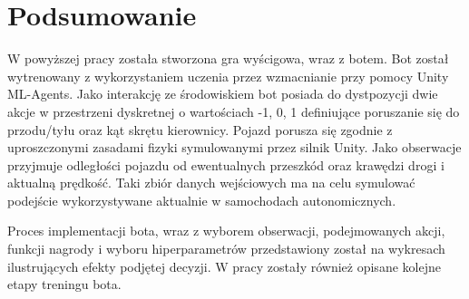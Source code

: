 \chapter*{Podsumowanie}
\thispagestyle{chapterBeginStyle}
W powyższej pracy została stworzona gra wyścigowa, wraz z botem. Bot został wytrenowany z wykorzystaniem uczenia przez wzmacnianie przy pomocy Unity ML-Agents. Jako interakcję ze środowiskiem bot posiada do dystpozycji dwie akcje w przestrzeni dyskretnej o wartościach {-1, 0, 1} definiujące poruszanie się do przodu/tyłu oraz kąt skrętu kierownicy. Pojazd porusza się zgodnie z uproszczonymi zasadami fizyki symulowanymi przez silnik Unity. Jako obserwacje przyjmuje odległości pojazdu od ewentualnych przeszkód oraz krawędzi drogi i aktualną prędkość. Taki zbiór danych wejściowych ma na celu symulować podejście wykorzystywane aktualnie w samochodach autonomicznych.

Proces implementacji bota, wraz z wyborem obserwacji, podejmowanych akcji, funkcji nagrody i wyboru hiperparametrów przedstawiony został na wykresach ilustrujących efekty podjętej decyzji. W pracy zostały również opisane kolejne etapy treningu bota.
